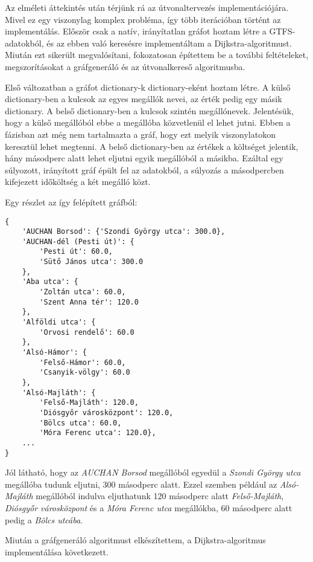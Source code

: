 
Az elméleti áttekintés után térjünk rá az útvonaltervezés implementációjára. Mivel ez egy viszonylag komplex probléma, így több iterációban történt az implementálás. Először csak a natív, irányítatlan gráfot hoztam létre a GTFS-adatokból, és az ebben való keresésre implementáltam a Dijkstra-algoritmust. Miután ezt sikerült megvalósítani, fokozatosan építettem be a további feltételeket, megszorításokat a gráfgeneráló és az útvonalkereső algoritmusba.

Első változatban a gráfot dictionary-k dic\-ti\-o\-na\-ry-eként hoztam létre. A külső dic\-ti\-o\-na\-ry-ben a kulcsok az egyes megállók nevei, az érték pedig egy másik dictionary. A belső dictionary-ben a kulcsok szintén megállónevek. Jelentésük, hogy a külső megállóból ebbe a megállóba közvetlenül el lehet jutni. Ebben a fázisban azt még nem tartalmazta a gráf, hogy ezt melyik viszonylatokon keresztül lehet megtenni. A belső dictionary-ben az értékek a költséget jelentik, hány másodperc alatt lehet eljutni egyik megállóból a másikba. Ezáltal egy súlyozott, irányított gráf épült fel az adatokból, a súlyozás a másodpercben kifejezett időköltség a két megálló közt.

Egy részlet az így felépített gráfból:

\begin{verbatim}
{
    'AUCHAN Borsod': {'Szondi György utca': 300.0},
    'AUCHAN-dél (Pesti út)': {
        'Pesti út': 60.0,
        'Sütő János utca': 300.0
    },
    'Aba utca': {
        'Zoltán utca': 60.0,
        'Szent Anna tér': 120.0
    },
    'Alföldi utca': {
        'Orvosi rendelő': 60.0
    },
    'Alsó-Hámor': {
        'Felső-Hámor': 60.0,
        'Csanyik-völgy': 60.0
    },
    'Alsó-Majláth': {
        'Felső-Majláth': 120.0,
        'Diósgyőr városközpont': 120.0,
        'Bölcs utca': 60.0,
        'Móra Ferenc utca': 120.0},
    ...
}
\end{verbatim}

Jól látható, hogy az \textit{AUCHAN Borsod} megállóból egyedül a \textit{Szondi György utca} megállóba tudunk eljutni, 300 másodperc alatt. Ezzel szemben például az \textit{Alsó-Majláth} megállóból indulva eljuthatunk 120 másodperc alatt \textit{Felső-Majláth}, \textit{Diósgyőr városközpont} és a \textit{Móra Ferenc utca} megállókba, 60 másodperc alatt pedig a \textit{Bölcs utcába}.

Miután a gráfgeneráló algoritmust elkészítettem, a Dijkstra-algoritmus implementálása következett.

